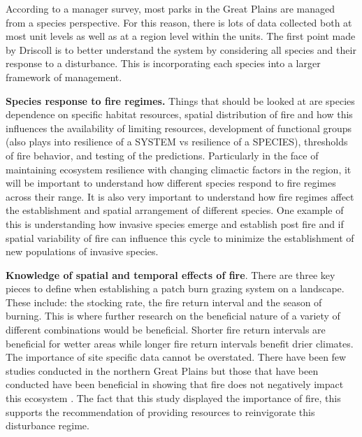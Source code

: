 According to a manager survey, most parks in the Great Plains are managed from a species perspective. 
For this reason, there is lots of data collected both at most unit levels as well as at a region level within the units.
The first point made by Driscoll is to better understand the system by considering all species and their response to a disturbance. 
This is incorporating each species into a larger framework of management.

\textbf{Species response to fire regimes.} Things that should be looked at are species dependence on specific habitat resources, spatial distribution of fire and how this influences the availability of limiting resources, development of functional groups (also plays into resilience of a SYSTEM vs resilience of a SPECIES), thresholds of fire behavior, and testing of the predictions. 
Particularly in the face of maintaining ecosystem resilience with changing climactic factors in the region, it will be important to understand how different species respond to fire regimes across their range.
 It is also very important to understand how fire regimes affect the establishment and spatial arrangement of different species. 
One example of this is understanding how invasive species emerge and establish post fire and if spatial variability of fire can influence this cycle to minimize the establishment of new populations of invasive species.

\textbf{Knowledge of spatial and temporal effects of fire}. There are three key pieces to define when establishing a patch burn grazing system on a landscape. 
These include: the stocking rate, the fire return interval and the season of burning. 
This is where further research on the beneficial nature of a variety of different combinations would be beneficial.
Shorter fire return intervals are beneficial for wetter areas while longer fire return intervals benefit drier climates. 
The importance of site specific data cannot be overstated. 
There have been few studies conducted in the northern Great Plains but those that have been conducted have been beneficial in showing that fire does not negatively impact this ecosystem \citep{vermeire2011}. 
The fact that this study displayed the importance of fire, this supports the recommendation of providing resources to reinvigorate this disturbance regime.

